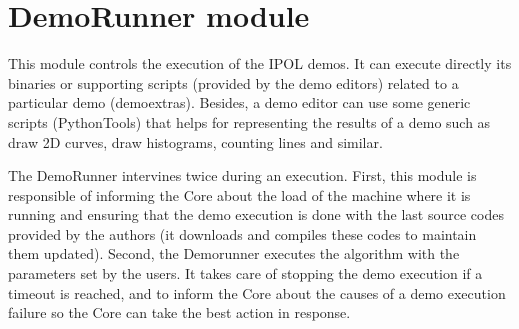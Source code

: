 
\section{DemoRunner module}
\label{sec:DemoRunner}

This module controls the execution of the IPOL demos. It can execute directly its binaries or supporting scripts (provided by the demo editors) related to a particular demo (demoextras). Besides, a demo editor can use some generic scripts (PythonTools) that helps for representing the results of a demo such as draw 2D curves, draw histograms, counting lines and similar.

The DemoRunner intervines twice during an execution. First, this module is responsible of informing the Core about the load of the machine where it is running and ensuring that the demo execution is done with the last source codes provided by the authors (it downloads and compiles these codes to maintain them updated). Second, the Demorunner executes the algorithm with the parameters set by the users. It takes care of stopping the demo execution if a timeout is reached, and to inform the Core about the causes of a demo execution failure so the Core can take the best action in response. 